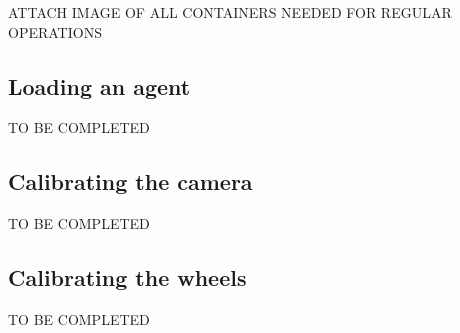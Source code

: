 ATTACH IMAGE OF ALL CONTAINERS NEEDED FOR REGULAR OPERATIONS

\subsection{Loading an agent}

TO BE COMPLETED

\subsection{Calibrating the camera}

TO BE COMPLETED

\subsection{Calibrating the wheels}

TO BE COMPLETED


